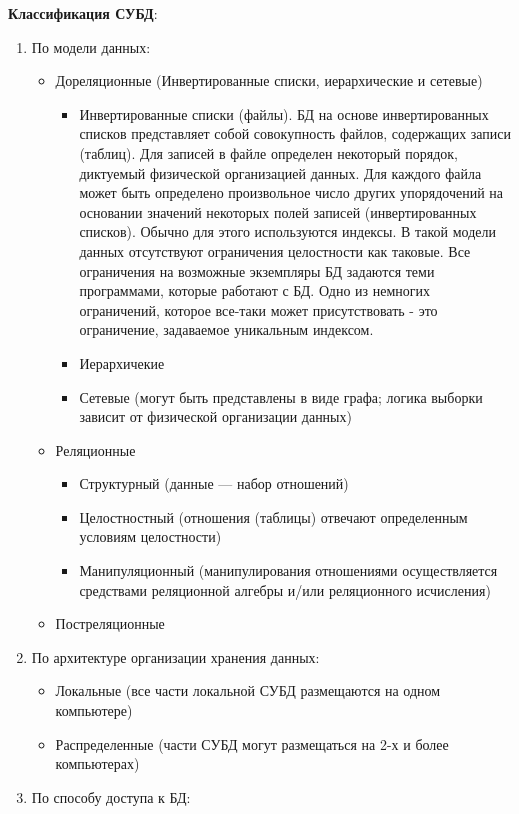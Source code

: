 \textbf{Классификация СУБД}:
\begin{enumerate}
	\item По модели данных:
	\begin{itemize}
		\item Дореляционные (Инвертированные списки, иерархические и сетевые)
		\begin{itemize}
			\item Инвертированные списки (файлы). БД на основе инвертированных списков представляет собой совокупность файлов, содержащих записи (таблиц). Для записей в файле определен некоторый порядок, диктуемый физической организацией данных. Для каждого файла может быть определено произвольное число других упорядочений на основании значений некоторых полей записей (инвертированных списков). Обычно для этого используются индексы. В такой модели данных отсутствуют ограничения целостности как таковые. Все ограничения на возможные экземпляры БД задаются теми программами, которые работают с БД. Одно из немногих ограничений, которое все-таки может присутствовать - это ограничение, задаваемое уникальным индексом. 
			\item Иерархичекие
			\item Сетевые (могут быть представлены в виде графа; логика выборки зависит от физической организации данных)
		\end{itemize}
		\item Реляционные
		\begin{itemize}
			\item Структурный (данные --- набор отношений)
			\item Целостностный (отношения (таблицы) отвечают определенным условиям целостности)
			\item Манипуляционный (манипулирования отношениями осуществляется средствами реляционной алгебры и/или реляционного исчисления)
		\end{itemize}
		\item Постреляционные
	\end{itemize}
	\item По архитектуре организации хранения данных:
	\begin{itemize}
		\item Локальные (все части локальной СУБД размещаются на одном компьютере)
		\item Распределенные (части СУБД могут размещаться на 2-х и более компьютерах) 
	\end{itemize}
	\item По способу доступа к БД:
	\begin{itemize}

\end{itemize}
\end{enumerate}
